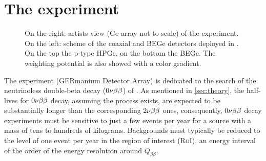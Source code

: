 \section{The {\gerda} experiment}\label{sec:gerda}
\begin{figure}[b!]
	\centering
\caption{On the right: artists view (Ge array not to scale) of the {\gerda} experiment. On the left: scheme of the coaxial and BEGe detectors deployed in {\gerda}. On the top the p-type HPGe, on the bottom the BEGe. The weighting potential is also showed with a color gradient.}
	\label{fig:artistviewanddet}
\end{figure}
The {\gerda} experiment \cite{gerdadescription} (GERmanium Detector Array) is dedicated to the search of the neutrinoless double-beta decay ($0\nu\beta\beta$) of . As mentioned in \cref{sec:theory}, the half-lives for $0\nu\beta\beta$ decay, assuming the process exists, are expected to be substantially longer than the corresponding $2\nu\beta\beta$ ones, consequently, $0\nu\beta\beta$ decay experiments must be sensitive to just a few events per year for a source with a mass of tens to hundreds of kilograms. Backgrounds must typically be reduced to the level of one event per year in the region of interest (\textsc{RoI}), an energy interval of the order of the energy resolution around $Q_{\beta\beta}$. 

